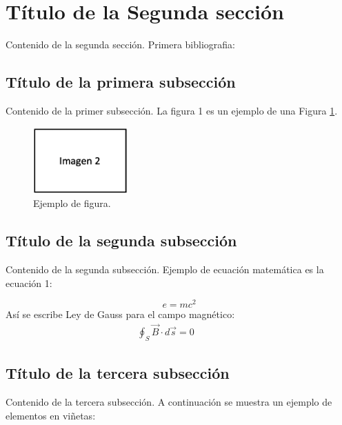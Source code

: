 \section{Título de la Segunda sección}
Contenido de la segunda sección. Primera bibliografia:\cite{bib2}

 \subsection{Título de la primera subsección}
Contenido de la primer subsección. La figura 1 es un ejemplo de una Figura \ref{imagen2}.

\begin{figure}[!h] %
    \begin{center}
        \includegraphics[scale=0.68]{secciones/imagenes/imagen2}
    \end{center}
    \caption{Ejemplo de figura. \label{imagen2}}
\end{figure}

\subsection{Título de la segunda subsección}
Contenido de la segunda subsección. Ejemplo de ecuación matemática es la ecuación 1:

\begin{equation}
    e=mc^2
    \label{ecuacion}
\end{equation}
Así se escribe Ley de Gauss para el campo magnético: %
\begin{align*}
        \oint_S \vec{B} \cdot d\vec{s} = 0& \qquad
\end{align*}

\subsection{Título de la tercera subsección}
Contenido de la tercera subsección. A continuación se muestra un ejemplo de elementos en viñetas:

